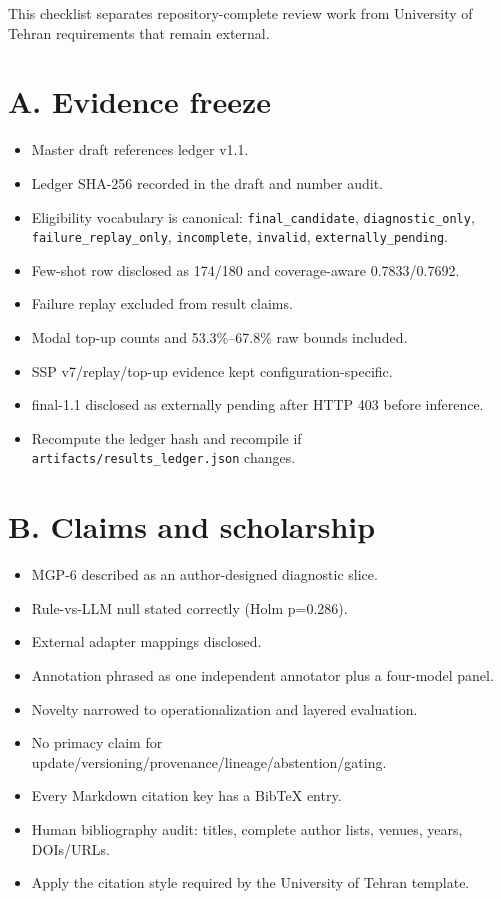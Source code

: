 This checklist separates repository-complete review work from University
of Tehran requirements that remain external.

\section{A. Evidence freeze}\label{a.-evidence-freeze}

\begin{itemize}
\tightlist
\item[$\boxtimes$]
  Master draft references ledger v1.1.
\item[$\boxtimes$]
  Ledger SHA-256 recorded in the draft and number audit.
\item[$\boxtimes$]
  Eligibility vocabulary is canonical: \texttt{final\_candidate},
  \texttt{diagnostic\_only}, \texttt{failure\_replay\_only},
  \texttt{incomplete}, \texttt{invalid}, \texttt{externally\_pending}.
\item[$\boxtimes$]
  Few-shot row disclosed as 174/180 and coverage-aware 0.7833/0.7692.
\item[$\boxtimes$]
  Failure replay excluded from result claims.
\item[$\boxtimes$]
  Modal top-up counts and 53.3\%--67.8\% raw bounds included.
\item[$\boxtimes$]
  SSP v7/replay/top-up evidence kept configuration-specific.
\item[$\boxtimes$]
  final-1.1 disclosed as externally pending after HTTP 403 before
  inference.
\item[$\square$]
  Recompute the ledger hash and recompile if
  \texttt{artifacts/results\_ledger.json} changes.
\end{itemize}

\section{B. Claims and scholarship}\label{b.-claims-and-scholarship}

\begin{itemize}
\tightlist
\item[$\boxtimes$]
  MGP-6 described as an author-designed diagnostic slice.
\item[$\boxtimes$]
  Rule-vs-LLM null stated correctly (Holm p=0.286).
\item[$\boxtimes$]
  External adapter mappings disclosed.
\item[$\boxtimes$]
  Annotation phrased as one independent annotator plus a four-model
  panel.
\item[$\boxtimes$]
  Novelty narrowed to operationalization and layered evaluation.
\item[$\boxtimes$]
  No primacy claim for
  update/versioning/provenance/lineage/abstention/gating.
\item[$\boxtimes$]
  Every Markdown citation key has a BibTeX entry.
\item[$\square$]
  Human bibliography audit: titles, complete author lists, venues,
  years, DOIs/URLs.
\item[$\square$]
  Apply the citation style required by the University of Tehran
  template.
\end{itemize}

